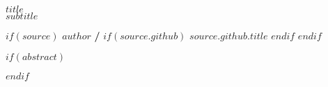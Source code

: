 \allsectionsfont{\normalfont\sffamily\bfseries}

\begin{center}
  \vspace*{0.5cm}
  
  \textbf{\Huge $title$}\\
  \vspace{0.1cm}
  \textsf{\textit{\large $subtitle$}}
  
  \vspace{0.5cm}
$if(source)$
  \textsf{\large $author$ \hspace{0.3cm}\textbf{/}\hspace{0.3cm}\large
  $if(source.github)$  \faGithub\space \href{$source.github.link$}{$source.github.title$} $endif$
  }
$endif$
\end{center}

$if(abstract)$
\begin{abstract}
$abstract$
\end{abstract}
$endif$
